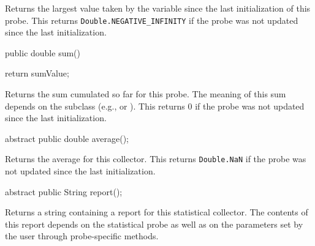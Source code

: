   \begin{tabb}  Returns the largest value taken by the variable
   since the last initialization
   of this probe.
   This returns \texttt{Double.NEGATIVE\_INFINITY}
   if the probe was not updated since the last initialization.
 \end{tabb}
\begin{htmlonly}
\end{htmlonly}
\begin{code}

   public double sum() \begin{hide} {
      return sumValue;
   } \end{hide}
\end{code}
  \begin{tabb}  Returns the sum cumulated so far for this probe.
   The meaning of this sum depends on the subclass (e.g.,  or
   ).
   This returns 0
   if the probe was not updated since the last initialization.
 \end{tabb}
\begin{htmlonly}
\end{htmlonly}
\begin{code}

   abstract public double average();
\end{code}
  \begin{tabb}  Returns the average for this collector.
   This returns \texttt{Double.NaN}
   if the probe was not updated since the last initialization.
 \end{tabb}
\begin{htmlonly}
\end{htmlonly}
\begin{code}

   abstract public String report();
\end{code}
  \begin{tabb}  Returns a string containing a report for this statistical
   collector. The contents of this report depends on the statistical probe as
   well as on the parameters set by the user through probe-specific methods.
 \end{tabb}
\begin{htmlonly}
\end{htmlonly}
